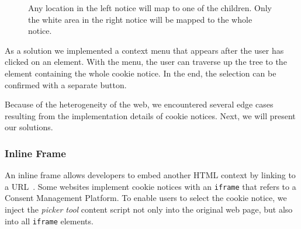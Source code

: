 \begin{figure}
	\centering
	\begin{minipage}{0.48\textwidth}
		\centering
	\end{minipage}\hfill
	\begin{minipage}{0.48\textwidth}
		\centering
	\end{minipage}
	\caption{Any location in the left notice will map to one of the children. Only the white area in the right notice will be mapped to the whole notice.}
	\label{fig:notice-fillout}
\end{figure}

As a solution we implemented a context menu that appears after the user has clicked on an element.
With the menu, the user can traverse up the tree to the element containing the whole cookie notice.
In the end, the selection can be confirmed with a separate button.

Because of the heterogeneity of the web, we encountered several edge cases resulting from the implementation details of cookie notices. 
Next, we will present our solutions.

\subsubsection{Inline Frame}
An inline frame allows developers to embed another HTML context by linking to a URL~\cite{iframeMdn}.
Some websites implement cookie notices with an \verb|iframe| that refers to a Consent Management Platform.
To enable users to select the cookie notice, we inject the \emph{picker tool} content script not only into the original web page, but also into all \verb|iframe| elements.


